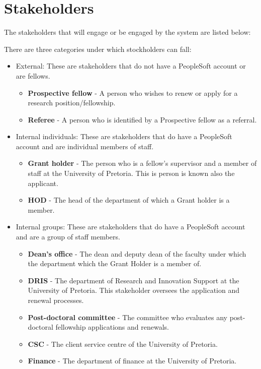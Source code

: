 \documentclass[12pt]{article}
\begin{document}
\vspace{0.5in}


\newpage
\section{Stakeholders} %
\vspace{0.2in}

The stakeholders that will engage or be engaged by the system are listed below:

There are three categories under which stockholders can fall:
\begin{itemize}	
\item External:
These are stakeholders that do not have a PeopleSoft account or are fellows.
\begin{itemize}	
\item \textbf{Prospective fellow} - A person who wishes to renew or apply for a research position/fellowship.
\item \textbf{Referee} - A person who is identified by a Prospective fellow as a referral.
\end{itemize}

\item Internal individuals:
These are stakeholders that do have a PeopleSoft account and are individual members of staff.
\begin{itemize}	
\item \textbf{Grant holder} - The person who is a fellow's supervisor and a member of staff at the University of Pretoria. This is person is known also the applicant.
\item \textbf{HOD} - The head of the department of which a Grant holder is a member.
\end{itemize}
\item Internal groups:
These are stakeholders that do have a PeopleSoft account and are a group of staff members.
\begin{itemize}	
\item \textbf{Dean's office} - The dean and deputy dean of the faculty under which the department which the Grant Holder is a member of.
\item \textbf{DRIS} - The department of Research and Innovation Support at the University of Pretoria. This stakeholder oversees the application and renewal processes.
\item \textbf{Post-doctoral committee} - The committee who evaluates any post-doctoral fellowship applications and renewals.
\item \textbf{CSC} - The client service centre of the University of Pretoria.
\item \textbf{Finance} - The department of finance at the University of Pretoria.
\end{itemize}
\end{itemize}
\vspace{0.5in}
\end{document}
